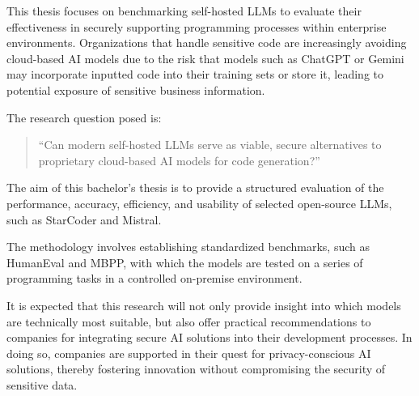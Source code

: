 This thesis focuses on benchmarking self-hosted \glspl{LLM} to evaluate their effectiveness in securely supporting programming processes within enterprise environments. Organizations that handle sensitive code are increasingly avoiding cloud-based \gls{AI} models due to the risk that models such as ChatGPT or Gemini may incorporate inputted code into their training sets or store it, leading to potential exposure of sensitive business information.

The research question posed is:  
\begin{quote}
  ``Can modern self-hosted LLMs serve as viable, secure alternatives to proprietary cloud-based \gls{AI} models for code generation?''
\end{quote}

The aim of this bachelor’s thesis is to provide a structured evaluation of the performance, accuracy, efficiency, and usability of selected open-source \glspl{LLM}, such as StarCoder and Mistral.

The methodology involves establishing standardized benchmarks, such as HumanEval and \gls{MBPP}, with which the models are tested on a series of programming tasks in a controlled on-premise environment.

It is expected that this research will not only provide insight into which models are technically most suitable, but also offer practical recommendations to companies for integrating secure \gls{AI} solutions into their development processes. In doing so, companies are supported in their quest for privacy-conscious \gls{AI} solutions, thereby fostering innovation without compromising the security of sensitive data.
